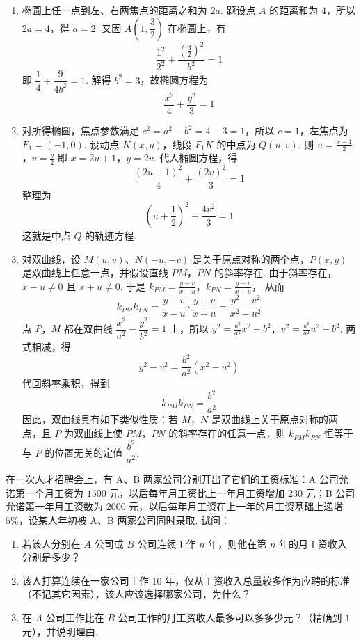 \begin{solution}
\begin{enumerate}
\item 椭圆上任一点到左、右两焦点的距离之和为 \(2a\). 题设点 \(A\) 的距离和为 \(4\)，所以 \(2a=4\)，得 \(a=2\). 又因 \(A\left(1,\dfrac{3}{2}\right)\) 在椭圆上，有
\[
\frac{1^2}{2^2}+\frac{(\frac{3}{2})^2}{b^2}=1
\]
即 \(\dfrac{1}{4}+\dfrac{9}{4b^2}=1\). 解得 \(b^2=3\)，故椭圆方程为
\[
\frac{x^2}{4}+\frac{y^2}{3}=1
\]

\item 对所得椭圆，焦点参数满足 \(c^2=a^2-b^2=4-3=1\)，所以 \(c=1\)，左焦点为 \(F_1=(-1,0)\). 设动点 \(K(x,y)\)，线段 \(F_1K\) 的中点为 \(Q(u,v)\). 则
\(u=\frac{x-1}{2}\)，\(v=\frac{y}{2}\)
即 \(x=2u+1\)，\(y=2v\). 代入椭圆方程，得
\[
\frac{(2u+1)^2}{4}+\frac{(2v)^2}{3}=1
\]
整理为
\[
\left(u+\frac{1}{2}\right)^2+\frac{4v^2}{3}=1
\]
这就是中点 \(Q\) 的轨迹方程.


\item 对双曲线，设 \(M(u,v)\)、\(N(-u,-v)\) 是关于原点对称的两个点，\(P(x,y)\) 是双曲线上任意一点，并假设直线 \(PM\)，\(PN\) 的斜率存在. 由于斜率存在，\(x-u\ne0\) 且 \(x+u\ne0\). 于是
\(k_{PM}=\frac{y-v}{x-u}\)，\(k_{PN}=\frac{y+v}{x+u}\)，
从而
\[
k_{PM}k_{PN}
=\frac{y-v}{x-u}\cdot\frac{y+v}{x+u}
=\frac{y^2-v^2}{x^2-u^2}
\]
点 \(P\)，\(M\) 都在双曲线 \(\dfrac{x^2}{a^2}-\dfrac{y^2}{b^2}=1\) 上，所以
\(y^2=\frac{b^2}{a^2}x^2-b^2\)，\(v^2=\frac{b^2}{a^2}u^2-b^2\).
两式相减，得
\[
y^2-v^2=\frac{b^2}{a^2}(x^2-u^2)
\]
代回斜率乘积，得到
\[
k_{PM}k_{PN}=\frac{b^2}{a^2}
\]
因此，双曲线具有如下类似性质：若 \(M\)，\(N\) 是双曲线上关于原点对称的两点，且 \(P\) 为双曲线上使 \(PM\)，\(PN\) 的斜率存在的任意一点，则 \(k_{PM}k_{PN}\) 恒等于与 \(P\) 的位置无关的定值 \(\dfrac{b^2}{a^2}\).
\end{enumerate}
\end{solution}

\begin{problem}
在一次人才招聘会上，有 A、B 两家公司分别开出了它们的工资标准：A 公司允诺第一个月工资为 \(1500\text{ 元}\)，以后每年月工资比上一年月工资增加 \(230\text{ 元}\)；B 公司允诺第一年月工资数为 \(2000\text{ 元}\)，以后每年月工资在上一年的月工资基础上递增 \(5\%\)，设某人年初被 A、B 两家公司同时录取. 试问：

\begin{enumerate}
\item 若该人分别在 \(A\) 公司或 \(B\) 公司连续工作 \(n\text{ 年}\)，则他在第 \(n\text{ 年}\)的月工资收入分别是多少？
\item 该人打算连续在一家公司工作 \(10\text{ 年}\)，仅从工资收入总量较多作为应聘的标准（不记其它因素），该人应该选择哪家公司，为什么？
\item 在 \(A\) 公司工作比在 \(B\) 公司工作的月工资收入最多可以多多少元？（精确到 \(1\) 元），并说明理由.
\end{enumerate}
\end{problem}

